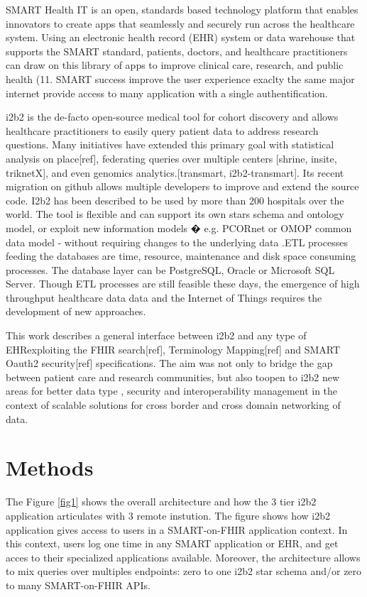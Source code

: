 \documentclass{amia}
\begin{document}
SMART Health IT is an open, standards based technology platform that enables innovators to create apps that seamlessly and securely run across the healthcare system. Using an electronic health record (EHR) system or data warehouse that supports the SMART standard, patients, doctors, and healthcare practitioners can draw on this library of apps to improve clinical care, research, and public health (11. SMART success improve the user experience exaclty the same major internet provide access to many application with a single authentification.

i2b2 is the de-facto open-source medical tool for cohort discovery and allows  healthcare practitioners to easily query patient data to address research questions. Many initiatives have extended this primary goal with statistical analysis on place[ref], federating queries over multiple centers [shrine, insite, triknetX], and even genomics analytics.[transmart, i2b2-transmart]. Its recent migration on github allows multiple developers to improve and extend the source code. I2b2 has been described to be used by more than 200 hospitals over the world. The tool is flexible and can support its own stars schema and ontology model, or exploit new information models � e.g. PCORnet  or OMOP common data model - without requiring changes to the underlying data .ETL processes feeding the databases are time, resource, maintenance and disk space consuming processes. The database layer can be PostgreSQL, Oracle or Microsoft SQL Server. Though ETL processes are still feasible these days, the emergence of high throughput healthcare data data and the Internet of Things requires the development of new approaches.

This work describes a general interface between i2b2 and any type of EHRexploiting the FHIR search[ref], Terminology Mapping[ref] and SMART Oauth2 security[ref] specifications. The aim was not only to bridge the gap between patient care and research communities, but also toopen to i2b2 new areas for  better data type , security and interoperability management in the context of scalable solutions for cross border and cross domain networking of data.
\section*{Methods}

The Figure \ref{fig1} shows the overall architecture and how the 3 tier i2b2 application articulates with 3 remote instution. The figure shows how i2b2 application gives access to users in a SMART-on-FHIR application context. In this context, users log one time in any SMART application or EHR, and get acces to their specialized applications available. Moreover, the architecture allows to mix queries over multiples endpoints: zero to one i2b2 star schema and/or zero to many SMART-on-FHIR APIs.
\end{document}
